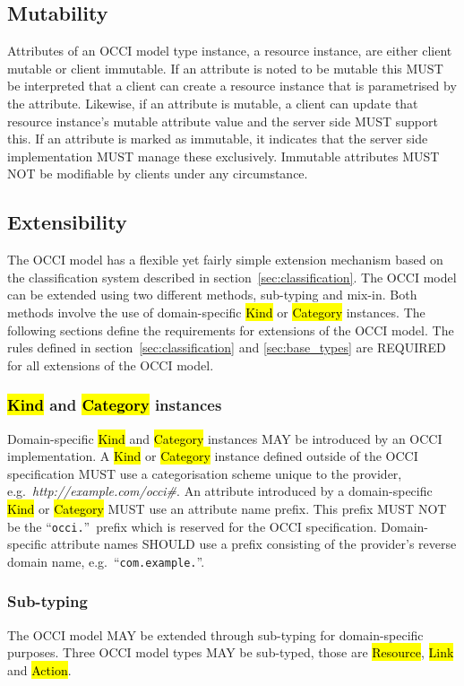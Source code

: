 \documentclass[10pt,a4paper,british]{article}
\begin{document}
\subsection{Mutability}
Attributes of an OCCI model type instance, a resource instance, are
either client mutable or client immutable. If an attribute is noted to
be mutable this MUST be interpreted that a client can create a
resource instance that is parametrised by the attribute. Likewise, if
an attribute is mutable, a client can update that resource instance's
mutable attribute value and the server side MUST support this. If an
attribute is marked as immutable, it indicates that the server side
implementation MUST manage these exclusively. Immutable attributes
MUST NOT be modifiable by clients under any circumstance.

\subsection{Extensibility}
\label{sec:extensibility}
The OCCI model has a flexible yet fairly simple extension mechanism based on
the classification system described in section~\ref{sec:classification}.
%
The OCCI model can be extended using two different methods, sub-typing and
mix-in. Both methods involve the use of domain-specific \hl{Kind} or
\hl{Category} instances. The following sections define the requirements for
extensions of the OCCI model.
%
The rules defined in section~\ref{sec:classification} and \ref{sec:base_types}
are REQUIRED for all extensions of the OCCI model.

\subsubsection{\hl{Kind} and \hl{Category} instances}
\label{sec:ext:category}
Domain-specific \hl{Kind} and \hl{Category} instances MAY be introduced by an
OCCI implementation.
%
A \hl{Kind} or \hl{Category} instance defined outside of the OCCI
specification MUST use a categorisation scheme unique to the provider,
e.g.~\textit{http://example.com/occi\#}.
%
An attribute introduced by a domain-specific \hl{Kind} or \hl{Category} MUST
use an attribute name prefix. This prefix MUST NOT be the ``\texttt{occi.}''~prefix
which is reserved for the OCCI specification. Domain-specific attribute names
SHOULD use a prefix consisting of the provider's reverse domain name,
e.g.~``\texttt{com.example.}''.

\subsubsection{Sub-typing}
The OCCI model MAY be extended through sub-typing for domain-specific purposes.
Three OCCI model types MAY be sub-typed, those are \hl{Resource}, \hl{Link} and
\hl{Action}.
\end{document}

